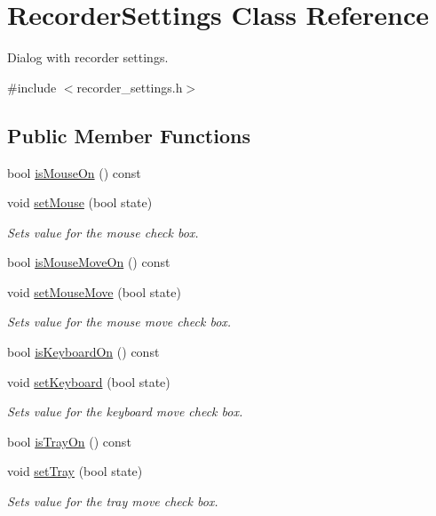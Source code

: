\hypertarget{class_recorder_settings}{\section{Recorder\-Settings Class Reference}
\label{class_recorder_settings}
}


Dialog with recorder settings.  




{\ttfamily \#include $<$recorder\-\_\-settings.\-h$>$}

\subsection*{Public Member Functions}
\begin{DoxyCompactItemize}
\item 
bool \hyperlink{class_recorder_settings_a91e3abc9690e2383cb201dd6115a4f29}{is\-Mouse\-On} () const 
\item 
void \hyperlink{class_recorder_settings_ae39869b2aef7c70585c0bca1fc919747}{set\-Mouse} (bool state)
\begin{DoxyCompactList}\small\item\em Sets value for the mouse check box. \end{DoxyCompactList}\item 
bool \hyperlink{class_recorder_settings_a8925af6fa99e544ec9e6b8a19135aa73}{is\-Mouse\-Move\-On} () const 
\item 
void \hyperlink{class_recorder_settings_a8bec45dd3188c1a74ffec65aca9d0087}{set\-Mouse\-Move} (bool state)
\begin{DoxyCompactList}\small\item\em Sets value for the mouse move check box. \end{DoxyCompactList}\item 
bool \hyperlink{class_recorder_settings_a4e7c5a7f013b04c16d47abe153cd4b3e}{is\-Keyboard\-On} () const 
\item 
void \hyperlink{class_recorder_settings_a70626f38c6271ad3bec593ada80a9051}{set\-Keyboard} (bool state)
\begin{DoxyCompactList}\small\item\em Sets value for the keyboard move check box. \end{DoxyCompactList}\item 
bool \hyperlink{class_recorder_settings_a62593e6a3c9f6a732c0a47a17791be4d}{is\-Tray\-On} () const 
\item 
void \hyperlink{class_recorder_settings_a6f17eef5849611dbe73ae61e0a033063}{set\-Tray} (bool state)
\begin{DoxyCompactList}\small\item\em Sets value for the tray move check box. \end{DoxyCompactList}\end{DoxyCompactItemize}
